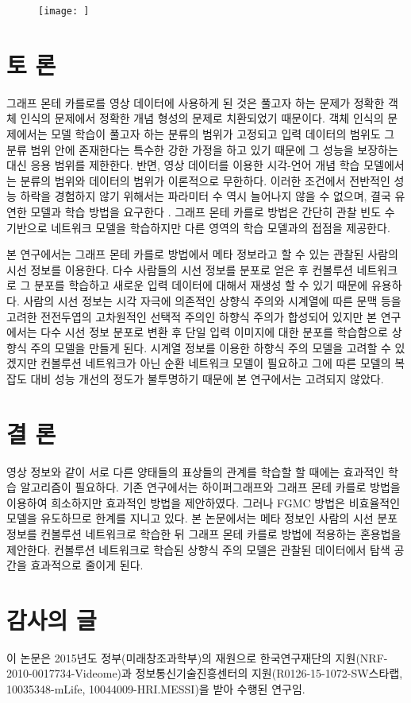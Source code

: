 \documentclass{kcc}
\begin{document}
\begin{figure}
  \centerline{\texttt{[image: ]}}
  \caption{}
  \label{fig:memtest-nested}
\end{figure}
\fi

\section{토 론}

그래프 몬테 카를로를 영상 데이터에 사용하게 된 것은 풀고자 하는 문제가 정확한 객체 인식의 문제에서 정확한 개념 형성의 문제로 치환되었기 때문이다. 객체 인식의 문제에서는 모델 학습이 풀고자 하는 분류의 범위가 고정되고 입력 데이터의 범위도 그 분류 범위 안에 존재한다는 특수한 강한 가정을 하고 있기 때문에 그 성능을 보장하는 대신 응용 범위를 제한한다. 반면, 영상 데이터를 이용한 시각-언어 개념 학습 모델에서는 분류의 범위와 데이터의 범위가 이론적으로 무한하다. 이러한 조건에서 전반적인 성능 하락을 경험하지 않기 위해서는 파라미터 수 역시 늘어나지 않을 수 없으며, 결국 유연한 모델과 학습 방법을 요구한다 \cite{zhang1994incremental}. 그래프 몬테 카를로 방법은 간단히 관찰 빈도 수 기반으로 네트워크 모델을 학습하지만 다른 영역의 학습 모델과의 접점을 제공한다.

본 연구에서는 그래프 몬테 카를로 방법에서 메타 정보라고 할 수 있는 관찰된 사람의 시선 정보를 이용한다. 다수 사람들의 시선 정보를 분포로 얻은 후 컨볼루션 네트워크로 그 분포를 학습하고 새로운 입력 데이터에 대해서 재생성 할 수 있기 때문에 유용하다. 사람의 시선 정보는 시각 자극에 의존적인 상향식 주의와 시계열에 따른 문맥 등을 고려한 전전두엽의 고차원적인 선택적 주의인 하향식 주의가 합성되어 있지만 본 연구에서는 다수 시선 정보 분포로 변환 후 단일 입력 이미지에 대한 분포를 학습함으로 상향식 주의 모델을 만들게 된다. 시계열 정보를 이용한 하향식 주의 모델을 고려할 수 있겠지만 컨볼루션 네트워크가 아닌 순환 네트워크 모델이 필요하고 그에 따른 모델의 복잡도 대비 성능 개선의 정도가 불투명하기 때문에 본 연구에서는 고려되지 않았다.

\section{결 론}

영상 정보와 같이 서로 다른 양태들의 표상들의 관계를 학습할 할 때에는 효과적인 학습 알고리즘이 필요하다. 기존 연구에서는 하이퍼그래프와 그래프 몬테 카를로 방법을 이용하여 희소하지만 효과적인 방법을 제안하였다. 그러나 FGMC 방법은 비효율적인 모델을 유도하므로 한계를 지니고 있다. 본 논문에서는 메타 정보인 사람의 시선 분포 정보를 컨볼루션 네트워크로 학습한 뒤 그래프 몬테 카를로 방법에 적용하는 혼용법을 제안한다. 컨볼루션 네트워크로 학습된 상향식 주의 모델은 관찰된 데이터에서 탐색 공간을 효과적으로 줄이게 된다. 

\section{감사의 글}
이 논문은 2015년도 정부(미래창조과학부)의 재원으로 한국연구재단의 지원(NRF-2010-0017734-Videome)과 정보통신기술진흥센터의 지원(R0126-15-1072-SW스타랩, 10035348-mLife, 10044009-HRI.MESSI)을 받아 수행된 연구임.



\end{document}
